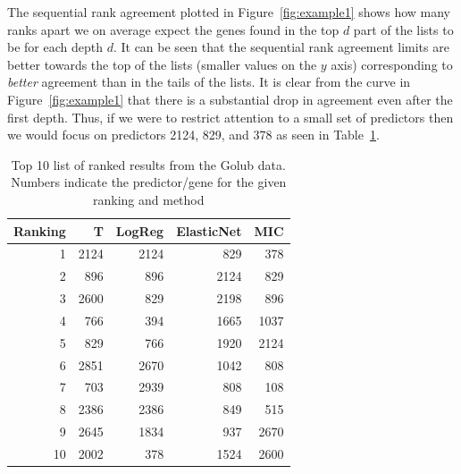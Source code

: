 \documentclass[12pt,a4paper]{article}
\theoremstyle{plain}
\begin{document}
The sequential rank agreement plotted in Figure~\ref{fig:example1}
shows how many ranks apart we on average expect the genes found in the
top $d$ part of the lists to be for each depth $d$.  It can be seen
that the sequential rank agreement limits are better towards the top
of the lists (smaller values on the $y$ axis) corresponding to
\emph{better} agreement than in the tails of the lists. It is clear
from the curve in Figure~\ref{fig:example1} that there is a
substantial drop in agreement even after the first depth. Thus, if we
were to restrict attention to a small set of predictors then we would
focus on predictors 2124, 829, and 378 as seen in Table~\ref{tab1}.













\begin{table}[tb]
\centering
\caption{Top 10 list of ranked results from the Golub data. Numbers indicate the predictor/gene for the given ranking and method} 
\label{tab1}
\begin{tabular}{rrrrr}
  \hline
Ranking & T & LogReg & ElasticNet & MIC \\ 
  \hline
1 & 2124 & 2124 & 829 & 378 \\ 
  2 & 896 & 896 & 2124 & 829 \\ 
  3 & 2600 & 829 & 2198 & 896 \\ 
  4 & 766 & 394 & 1665 & 1037 \\ 
  5 & 829 & 766 & 1920 & 2124 \\ 
  6 & 2851 & 2670 & 1042 & 808 \\ 
  7 & 703 & 2939 & 808 & 108 \\ 
  8 & 2386 & 2386 & 849 & 515 \\ 
  9 & 2645 & 1834 & 937 & 2670 \\ 
  10 & 2002 & 378 & 1524 & 2600 \\ 
   \hline
\end{tabular}
\end{table}
\end{document}
